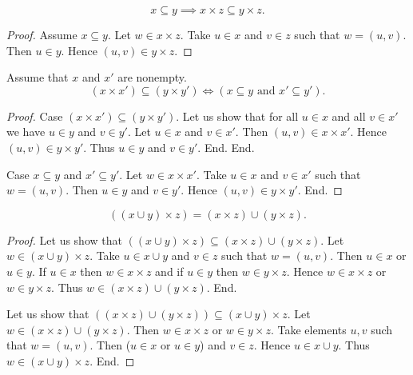 \documentclass[../../sets-and-functions.ftl.tex]{subfiles}
\begin{document}
  \begin{forthel}
    \begin{proposition}[SF 01 05 197314]
      \[ x \subseteq y \implies x \times z \subseteq y \times z. \]
    \end{proposition}
    \begin{proof}
      Assume $x \subseteq y$.
      Let $w \in x \times z$.
      Take $u \in x$ and $v \in z$ such that $w = (u,v)$.
      Then $u \in y$.
      Hence $(u,v) \in y \times z$.
    \end{proof}

    \begin{proposition}[SF 01 05 238807]
      Assume that $x$ and $x'$ are nonempty.
      \[ (x \times x') \subseteq (y \times y') \iff (\text{$x \subseteq y$ and $x' \subseteq y'$}). \]
    \end{proposition}
    \begin{proof}
      Case $(x \times x') \subseteq (y \times y')$.
        Let us show that for all $u \in x$ and all $v \in x'$ we have $u \in y$ and $v \in y'$.
          Let $u \in x$ and $v \in x'$.
          Then $(u,v) \in x \times x'$.
          Hence $(u,v) \in y \times y'$.
          Thus $u \in y$ and $v \in y'$.
        End.
      End.

      Case $x \subseteq y$ and $x' \subseteq y'$.
        Let $w \in x \times x'$.
        Take $u \in x$ and $v \in x'$ such that $w = (u,v)$.
        Then $u \in y$ and $v \in y'$.
        Hence $(u,v) \in y \times y'$.
      End.
    \end{proof}

    \begin{proposition}[SF 01 05 138531]
      \[ ((x \cup y) \times z) = (x \times z) \cup (y \times z). \]
    \end{proposition}
    \begin{proof}
      Let us show that $((x \cup y) \times z) \subseteq (x \times z) \cup (y \times z).$
        Let $w \in (x \cup y) \times z$.
        Take $u \in x \cup y$ and $v \in z$ such that $w = (u,v)$.
        Then $u \in x$ or $u \in y$.
        If $u \in x$ then $w \in x \times z$ and if $u \in y$ then $w \in y \times z$.
        Hence $w \in x \times z$ or $w \in y \times z$.
        Thus $w \in (x \times z) \cup (y \times z)$.
      End.

      Let us show that $((x \times z) \cup (y \times z)) \subseteq (x \cup y) \times z$.
        Let $w \in (x \times z) \cup (y \times z)$.
        Then $w \in x \times z$ or $w \in y \times z$.
        Take elements $u,v$ such that $w = (u,v)$.
        Then ($u \in x$ or $u \in y$) and $v \in z$.
        Hence $u \in x \cup y$.
        Thus $w \in (x \cup y) \times z$.
      End.
    \end{proof}


\end{forthel}
\end{document}

